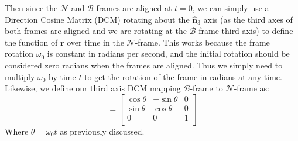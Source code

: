 \documentclass[titlepage]{article}
\begin{document}
Then since the $\mathcal{N}$ and $\mathcal{B}$ frames are aligned at $t=0$, we can simply use a Direction Cosine Matrix (DCM) rotating about the $\hat{\boldsymbol{n}}_3$ axis (as the third axes of both frames are aligned and we are rotating at the $\mathcal{B}$-frame third axis) to define the function of $\boldsymbol{r}$ over time in the $\mathcal{N}$-frame. This works because the frame rotation $\omega_0$ is constant in radians per second, and the initial rotation should be considered zero radians when the frames are aligned. Thus we simply need to multiply $\omega_0$ by time $t$ to get the rotation of the frame in radians at any time.\\

Likewise, we define our third axis DCM mapping $\mathcal{B}$-frame to $\mathcal{N}$-frame as:
\begin{equation}
	[NB]=
	\begin{bmatrix}
		\cos\theta & -\sin\theta & 0 \\
		\sin\theta & \cos\theta & 0 \\
		0 & 0 & 1 \\
	\end{bmatrix}
\end{equation} 
Where $\theta=\omega_0t$ as previously discussed.\\
\end{document}
